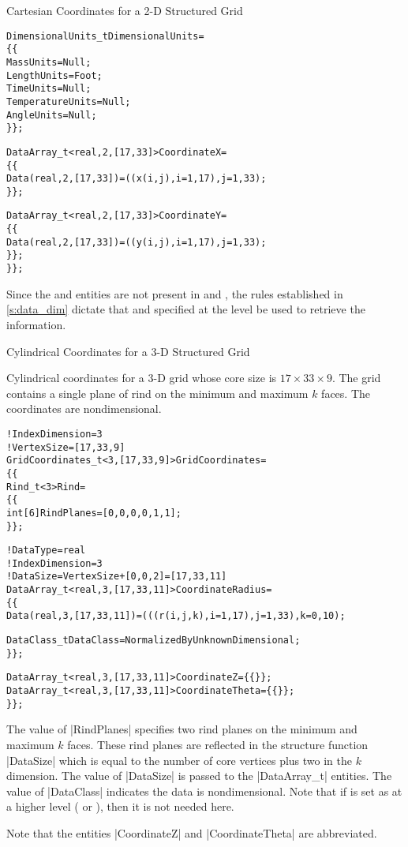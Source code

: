 \begin{example}{Cartesian Coordinates for a 2-D Structured Grid}
\begin{alltt}
    DimensionalUnits\_t DimensionalUnits = 
      \{\{ 
      MassUnits        = Null ;
      LengthUnits      = Foot ;
      TimeUnits        = Null ;
      TemperatureUnits = Null ;
      AngleUnits       = Null ;
      \}\} ;

    DataArray\_t<real, 2, [17,33]> CoordinateX =
      \{\{
      Data(real, 2, [17,33]) = ((x(i,j), i=1,17), j=1,33) ;
      \}\} ;

    DataArray\_t<real, 2, [17,33]> CoordinateY =
      \{\{
      Data(real, 2, [17,33]) = ((y(i,j), i=1,17), j=1,33) ;
      \}\} ;
    \}\} ;
\end{alltt}
Since the  and  entities are not
present in  and , the rules
established in \autoref{s:data_dim} dictate that 
and  specified at the 
level be used to retrieve the information.
\end{example}

\newpage
\begin{example}{Cylindrical Coordinates for a 3-D Structured Grid}
\label{ex:grid2}

Cylindrical coordinates for a 3-D grid whose core size is
$17\times33\times9$.
The grid contains a single plane of rind on the minimum and maximum $k$
faces.
The coordinates are nondimensional.
\begin{alltt}
  !  IndexDimension = 3
  !  VertexSize = [17,33,9]
  GridCoordinates\_t<3, [17,33,9]> GridCoordinates =
    \{\{
    Rind\_t<3> Rind =
      \{\{
      int[6] RindPlanes = [0,0,0,0,1,1] ;
      \}\} ;

    ! DataType = real
    ! IndexDimension = 3
    ! DataSize = VertexSize + [0,0,2] = [17,33,11]
    DataArray\_t<real, 3, [17,33,11]> CoordinateRadius =
      \{\{
      Data(real, 3, [17,33,11]) = (((r(i,j,k), i=1,17), j=1,33), k=0,10) ;

      DataClass\_t DataClass = NormalizedByUnknownDimensional ;
      \}\} ;

    DataArray\_t<real, 3, [17,33,11]> CoordinateZ     = \{\{ \}\} ;
    DataArray\_t<real, 3, [17,33,11]> CoordinateTheta = \{\{ \}\} ;
    \}\} ;
\end{alltt}
The value of |RindPlanes| specifies two rind planes on the minimum and
maximum $k$ faces.
These rind planes are reflected in the structure function |DataSize|
which is equal to the number of core vertices plus two in the  $k$ dimension.
The value of |DataSize| is passed to the |DataArray_t| entities.
The value of |DataClass| indicates the data is nondimensional.
Note that if  is set as 
at a  higher level ( or ), then it is not
needed here.

Note that the entities |CoordinateZ| and |CoordinateTheta| are abbreviated.
\end{example}

